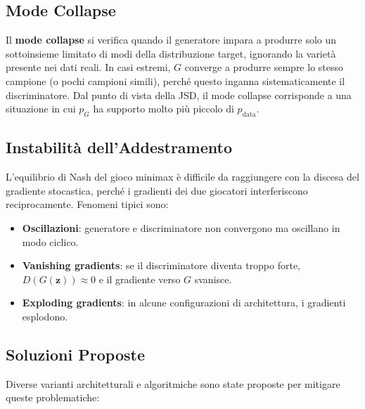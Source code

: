 \subsection{Mode Collapse}
\label{subsec:mode-collapse}

Il \textbf{mode collapse} si verifica quando il generatore impara a
produrre solo un sottoinsieme limitato di modi della distribuzione
target, ignorando la varietà presente nei dati reali. In casi estremi,
$G$ converge a produrre sempre lo stesso campione (o pochi campioni
simili), perché questo inganna sistematicamente il discriminatore.
Dal punto di vista della JSD, il mode collapse corrisponde a una
situazione in cui $p_G$ ha supporto molto più piccolo di
$p_{\text{data}}$.

\subsection{Instabilità dell'Addestramento}
\label{subsec:training-instability}

L'equilibrio di Nash del gioco minimax è difficile da raggiungere con
la discesa del gradiente stocastica, perché i gradienti dei due
giocatori interferiscono reciprocamente. Fenomeni tipici sono:

\begin{itemize}
  \item \textbf{Oscillazioni}: generatore e discriminatore non
        convergono ma oscillano in modo ciclico.
  \item \textbf{Vanishing gradients}: se il discriminatore diventa
        troppo forte, $D(G(\mathbf{z})) \approx 0$ e il gradiente
        verso $G$ svanisce.
  \item \textbf{Exploding gradients}: in alcune configurazioni di
        architettura, i gradienti esplodono.
\end{itemize}

\subsection{Soluzioni Proposte}
\label{subsec:gan-solutions}

Diverse varianti architetturali e algoritmiche sono state proposte per
mitigare queste problematiche:

